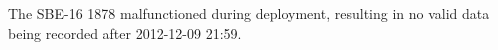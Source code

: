 The SBE-16 1878 malfunctioned during deployment, resulting in no valid data being recorded after 2012-12-09 21:59.